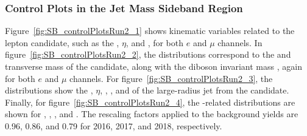 \subsubsection{Control Plots in the Jet Mass Sideband Region}

Figure~\ref{fig:SB_controlPlotsRun2_1} shows kinematic variables related to the lepton candidate, such as the \pt, $\eta$, and \ptmiss, for both $e$ and $\mu$ channels.
In figure~\ref{fig:SB_controlPlotsRun2_2}, the distributions correspond to the \pt and transverse mass of the \Wlep candidate, along with the diboson invariant mass \MVV, again for both $e$ and $\mu$ channels.
For figure~\ref{fig:SB_controlPlotsRun2_3}, the distributions show the \pt, $\eta$, \MJ, \nsubjDDT, and \DoubleB of the large-radius jet from the \Vhad candidate.
Finally, for figure~\ref{fig:SB_controlPlotsRun2_4}, the \VBF-related distributions are shown for \DetaVBF, \mjjVBF, \nJets, and \Dy.
The rescaling factors applied to the \Wjets background yields are 0.96, 0.86, and 0.79 for 2016, 2017, and 2018, respectively.

